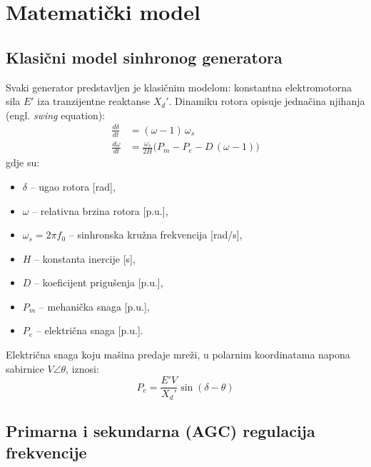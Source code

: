 \documentclass[12pt,oneside, a4paper]{book}
\begin{document}
\section{Matematički model}
 
\subsection{Klasični model sinhronog generatora}
 
Svaki generator predstavljen je klasičnim modelom: konstantna elektromotorna
sila $E'$ iza tranzijentne reaktanse $X_d'$. Dinamiku rotora opisuje jednačina njihanja (engl. \emph{swing} equation):
\begin{align}
  \frac{d\delta}{dt} &= (\omega - 1)\,\omega_s \label{eq:swing_delta} \\[5pt]
  \frac{d\omega}{dt} &= \frac{\omega_s}{2H}\Big(P_m - P_e - D\,(\omega - 1)\Big) \label{eq:swing_omega}
\end{align}
gdje su:
\begin{itemize}[label={}, leftmargin=1em, itemsep=0pt]
  \item $\delta$ -- ugao rotora [rad],
  \item $\omega$ -- relativna brzina rotora [p.u.],
  \item $\omega_s = 2\pi f_0$ -- sinhronska kružna frekvencija [rad/s],
  \item $H$ -- konstanta inercije [s],
  \item $D$ -- koeficijent prigušenja [p.u.],
  \item $P_m$ -- mehanička snaga [p.u.],
  \item $P_e$ -- električna snaga [p.u.].
\end{itemize}

\noindent Električna snaga koju mašina predaje mreži, u polarnim koordinatama napona sabirnice $V\angle\theta$, iznosi:
\begin{equation}
  P_e = \frac{E' V}{X_d'} \sin(\delta - \theta)
  \label{eq:pe}
\end{equation}
 
\subsection{Primarna i sekundarna (AGC) regulacija frekvencije}
 
\end{document}
